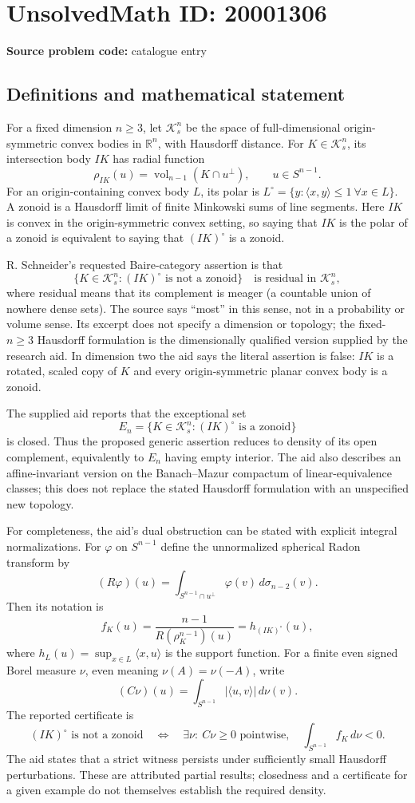 \documentclass[11pt]{article}
\newcommand{\R}{\mathbb{R}}
\begin{document}
\section*{UnsolvedMath ID: 20001306}
\textbf{Source problem code:} catalogue entry
\subsection{Definitions and mathematical statement}
For a fixed dimension $n\geq3$, let $\mathcal K_s^n$ be the space of full-dimensional origin-symmetric convex bodies in $\R^n$, with Hausdorff distance. For $K\in\mathcal K_s^n$, its intersection body $IK$ has radial function
\[
 \rho_{IK}(u)=\operatorname{vol}_{n-1}(K\cap u^\perp),\qquad u\in S^{n-1}.
\]
For an origin-containing convex body $L$, its polar is $L^\circ=\{y:\langle x,y\rangle\leq1\ \forall x\in L\}$. A zonoid is a Hausdorff limit of finite Minkowski sums of line segments. Here $IK$ is convex in the origin-symmetric convex setting, so saying that $IK$ is the polar of a zonoid is equivalent to saying that $(IK)^\circ$ is a zonoid.

R. Schneider's requested Baire-category assertion is that
\[
 \{K\in\mathcal K_s^n:(IK)^\circ\text{ is not a zonoid}\}
 \quad\text{is residual in }\mathcal K_s^n,
\]
where residual means that its complement is meager (a countable union of nowhere dense sets). The source says ``most'' in this sense, not in a probability or volume sense. Its excerpt does not specify a dimension or topology; the fixed-$n\geq3$ Hausdorff formulation is the dimensionally qualified version supplied by the research aid. In dimension two the aid says the literal assertion is false: $IK$ is a rotated, scaled copy of $K$ and every origin-symmetric planar convex body is a zonoid.

The supplied aid reports that the exceptional set
\[
 E_n=\{K\in\mathcal K_s^n:(IK)^\circ\text{ is a zonoid}\}
\]
is closed. Thus the proposed generic assertion reduces to density of its open complement, equivalently to $E_n$ having empty interior. The aid also describes an affine-invariant version on the Banach--Mazur compactum of linear-equivalence classes; this does not replace the stated Hausdorff formulation with an unspecified new topology.

For completeness, the aid's dual obstruction can be stated with explicit integral normalizations. For $\varphi$ on $S^{n-1}$ define the unnormalized spherical Radon transform by
\[
 (R\varphi)(u)=\int_{S^{n-1}\cap u^\perp}\varphi(v)\,d\sigma_{n-2}(v).
\]
Then its notation is
\[
 f_K(u)=\frac{n-1}{R(\rho_K^{n-1})(u)}=h_{(IK)^\circ}(u),
\]
where $h_L(u)=\sup_{x\in L}\langle x,u\rangle$ is the support function. For a finite even signed Borel measure $\nu$, even meaning $\nu(A)=\nu(-A)$, write
\[
 (C\nu)(u)=\int_{S^{n-1}}|\langle u,v\rangle|\,d\nu(v).
\]
The reported certificate is
\[
 (IK)^\circ\text{ is not a zonoid}
 \quad\Longleftrightarrow\quad
 \exists\nu:\ C\nu\geq0\text{ pointwise},\quad \int_{S^{n-1}}f_K\,d\nu<0.
\]
The aid states that a strict witness persists under sufficiently small Hausdorff perturbations. These are attributed partial results; closedness and a certificate for a given example do not themselves establish the required density.
\end{document}
